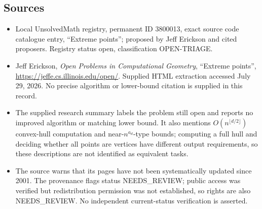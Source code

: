 \documentclass[11pt]{article}
\begin{document}
\subsection{Sources}
\begin{itemize}
\item Local UnsolvedMath registry, permanent ID 3800013, exact source code catalogue entry, ``Extreme points''; proposed by Jeff Erickson and cited proposers. Registry status open, classification OPEN-TRIAGE.
\item Jeff Erickson, \emph{Open Problems in Computational Geometry}, ``Extreme points'', \url{https://jeffe.cs.illinois.edu/open/}. Supplied HTML extraction accessed July 29, 2026. No precise algorithm or lower-bound citation is supplied in this record.
\item The supplied research summary labels the problem still open and reports no improved algorithm or matching lower bound. It also mentions $O(n^{\lfloor d/2\rfloor})$ convex-hull computation and near-$n^{a_d}$-type bounds; computing a full hull and deciding whether all points are vertices have different output requirements, so these descriptions are not identified as equivalent tasks.
\item The source warns that its pages have not been systematically updated since 2001. The provenance flags status NEEDS\_REVIEW; public access was verified but redistribution permission was not established, so rights are also NEEDS\_REVIEW. No independent current-status verification is asserted.
\end{itemize}
\end{document}
